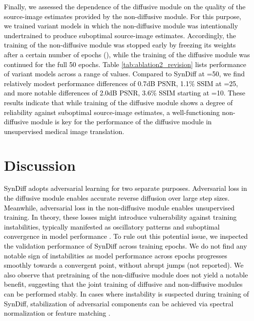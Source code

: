 \documentclass[journal,twoside,web]{ieeecolor}
\newcommand*{\revhl}{\textcolor{black}}
\begin{document}
\revhl{Finally, we assessed the dependence of the diffusive module on the quality of the source-image estimates provided by the non-diffusive module. For this purpose, we trained variant models in which the non-diffusive module was intentionally undertrained to produce suboptimal source-image estimates. Accordingly, the training of the non-diffusive module was stopped early by freezing its weights after a certain number of epochs (), while the training of the diffusive module was continued for the full 50 epochs. Table \ref{tab:ablation2_revision} lists performance of variant models across a range of  values. Compared to SynDiff at =50, we find relatively modest performance differences of 0.7dB PSNR, 1.1\% SSIM at =25, and more notable differences of 2.0dB PSNR, 3.6\% SSIM starting at =10. These results indicate that while training of the diffusive module shows a degree of reliability against suboptimal source-image estimates, a well-functioning non-diffusive module is key for the performance of the diffusive module in unsupervised medical image translation.}





\section{Discussion}
\revhl{SynDiff adopts adversarial learning for two separate purposes. Adversarial loss in the diffusive module enables accurate reverse diffusion over large step sizes. Meanwhile, adversarial loss in the non-diffusive module enables unsupervised training. In theory, these losses might introduce vulnerability against training instabilities, typically manifested as oscillatory patterns and suboptimal convergence in model performance \cite{mescheder2018training}. To rule out this potential issue, we inspected the validation performance of SynDiff across training epochs. We do not find any notable sign of instabilities as model performance across epochs progresses smoothly towards a convergent point, without abrupt jumps (not reported). We also observe that pretraining of the non-diffusive module does not yield a notable benefit, suggesting that the joint training of diffusive and non-diffusive modules can be performed stably. In cases where instability is suspected during training of SynDiff, stabilization of adversarial components can be achieved via spectral normalization or feature matching \cite{mescheder2018training}.}
\end{document}
